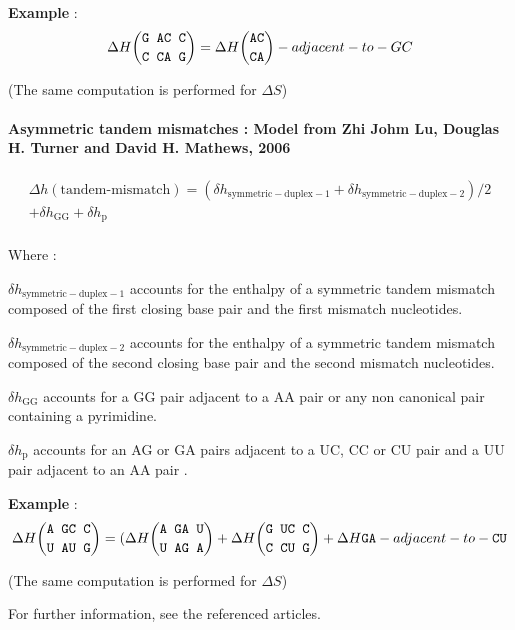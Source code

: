 \documentclass{article}
\begin{document}
\textbf{Example} :
\begin{multline*}
\Delta H {\mbox{\texttt{G AC C}} \choose \mbox{\texttt{C CA G}}} = 
\Delta H {\mbox{\texttt{AC}} \choose \mbox{\texttt{CA}}} -adjacent-to-GC\\
\end{multline*}

       (The same computation is performed for $\Delta S$)    

\paragraph{Asymmetric tandem mismatches : \textbf{Model from Zhi Johm Lu, Douglas H. Turner and David H. Mathews, 2006}}

\begin{multline*}
\Delta h {(\mbox{tandem-mismatch})} =
( \delta{}h_\mathrm{symmetric-duplex-1} +
\delta{}h_\mathrm{symmetric-duplex-2} ) / 2 \\ +
\delta{}h_\mathrm{GG} +
\delta{}h_\mathrm{p}\\
\end{multline*}

Where :

$\delta{}h_\mathrm{symmetric-duplex-1}$ accounts for the enthalpy of a symmetric tandem mismatch composed of
the first closing base pair and the first mismatch nucleotides.

$\delta{}h_\mathrm{symmetric-duplex-2}$ accounts for the enthalpy of a symmetric tandem mismatch composed of
the second closing base pair and the second mismatch nucleotides.

$\delta{}h_\mathrm{GG}$ accounts for a GG pair adjacent to a AA pair or any non canonical pair containing a pyrimidine.

$\delta{}h_\mathrm{p}$ accounts for an AG or GA pairs adjacent to a UC, CC or CU pair and a UU pair adjacent to an AA pair .

\textbf{Example} :
\begin{multline*}
\Delta H {\mbox{\texttt{A GC C}} \choose \mbox{\texttt{U AU G}}} =
( \Delta H {\mbox{\texttt{A GA U}} \choose \mbox{\texttt{U AG A}}} + 
\Delta H {\mbox{\texttt{G UC C}} \choose \mbox{\texttt{C CU G}}} +
\Delta H {\mbox{\texttt{GA}} -adjacent-to- \mbox{\texttt{CU}} } \\
\end{multline*}

       (The same computation is performed for $\Delta S$)
       
For further information, see the referenced articles.
\end{document}

